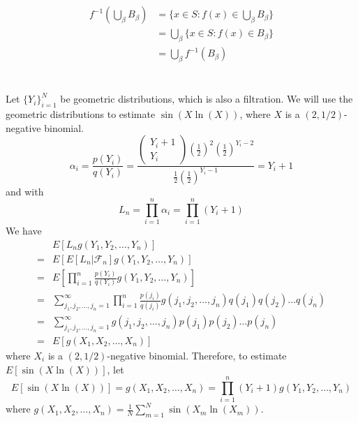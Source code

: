 \documentclass[11pt]{report}
\begin{document}
\subsection{}
\begin{equation*}
    \begin{aligned}
        f^{-1} \left(\bigcup_\beta B_\beta \right) &= \{x \in S: f(x) \in \bigcup_\beta B_\beta \} \\
        &= \bigcup_\beta \{x \in S: f(x) \in B_\beta\} \\
        &= \bigcup_\beta f^{-1}(B_\beta) 
    \end{aligned}
\end{equation*}
\newpage
\section{}
Let $\{Y_i\}_{i=1}^N$ be geometric distributions, which is also a filtration. We will use the geometric distributions to estimate $\sin(X \ln(X))$, 
where $X$ is a $(2,1/2)$-negative binomial.  
\[
    \alpha_i = \frac{p(Y_i)}{q(Y_i)} = \frac{\begin{pmatrix} Y_i+1 \\ Y_i \end{pmatrix} \left(\frac{1}{2}\right)^2 \left( \frac{1}{2}\right)^{Y_i-2}}{\frac{1}{2} \left( \frac{1}{2}\right)^{Y_i-1}} = Y_i + 1
\]
and with
\[
    L_n = \prod_{i=1}^n \alpha_i = \prod_{i=1}^n (Y_i + 1)
\]
We have
\begin{equation*}
    \begin{aligned}
        &E[L_n g(Y_1,Y_2, \hdots, Y_n)] \\
        =& E[ E[L_n | \mathcal{F}_n] g(Y_1, Y_2, \hdots, Y_n)] \\
        =& E\left[\prod_{i=1}^n \frac{p(Y_i)}{q(Y_i)} g(Y_1,Y_2, \hdots, Y_n) \right] \\
        =& \sum_{j_1, j_2, \hdots, j_n = 1}^\infty \prod_{i=1}^n \frac{p(j_i)}{q(j_i)} g(j_1, j_2, \hdots, j_n) q(j_1) q(j_2) \hdots q(j_n) \\
        =& \sum_{j_1, j_2, \hdots, j_n = 1}^\infty g(j_1, j_2, \hdots, j_n) p(j_1)p(j_2)\hdots p(j_n) \\
        =& E[g(X_1, X_2, \hdots, X_n)]
    \end{aligned}
\end{equation*}
where $X_i$ is a $(2,1/2)$-negative binomial.
Therefore, to estimate $E[\sin(X\ln(X))]$, let 
\[
    E[\sin(X\ln(X))] = g(X_1, X_2, \hdots, X_n) = \prod_{i=1}^n (Y_i+1) g(Y_1, Y_2, \hdots, Y_n)
\]
where $g(X_1, X_2, \hdots, X_n) = \frac{1}{N} \sum_{m=1}^N \sin(X_m \ln(X_m))$.
\end{document}
